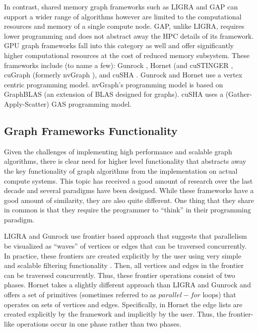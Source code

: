 In contrast, shared memory graph frameworks such as LIGRA \cite{shun2013ligra} and  GAP \cite{beamer2015gap} can support a wider range of algorithms however are limited to the computational resources and memory of a single compute node. GAP, unlike LIGRA, requires lower programming and does not abstract away the HPC details of its framework.
GPU graph frameworks fall into this category as well and offer significantly higher computational resources at the cost of reduced memory subsystem. 
These frameworks include (to name a few): Gunrock \cite{wang2015gunrock}, Hornet \cite{green-hornet} (and cuSTINGER \cite{DBLP:conf/hpec/GreenB16}, cuGraph (formerly nvGraph \cite{nvGraph}), and cuSHA \cite{cusha}.
Gunrock and Hornet use a vertex centric programming model. nvGraph's programming model is based on GraphBLAS (an extension of BLAS designed for graphs). cuSHA uses a (Gather-Apply-Scatter) GAS programming model.

\subsection{Graph Frameworks Functionality}

Given the challenges of implementing high performance and scalable graph algorithms, there is clear need for higher level functionality that abstracts away the key functionality of graph algorithms from the implementation on actual compute systems. This topic has received a good amount of research over the last decade and several paradigms have been designed. While these frameworks have a good amount of similarity, they are also quite different. One thing that they share in common is that they require the programmer to ``think'' in their programming paradigm.


LIGRA \cite{shun2013ligra} and Gunrock \cite{wang2015gunrock} use frontier based approach that suggests that parallelism be visualized as ``waves'' of vertices or edges that can be traversed concurrently. In practice, these frontiers are created explicitly by the user using very simple and scalable filtering functionality . Then, all vertices and edges in the frontier can be traversed concurrently. Thus, these frontier operations consist of two phases. Hornet \cite{green-hornet} takes a slightly different approach than LIGRA and Gunrock and offers a set of primitives (sometimes referred to as $parallel-for$ loops) that operates on sets of vertices and edges. Specifically, in Hornet the edge lists are created explicitly by the framework and implicitly by the user. Thus, the frontier-like operations occur in one phase rather than two phases.

